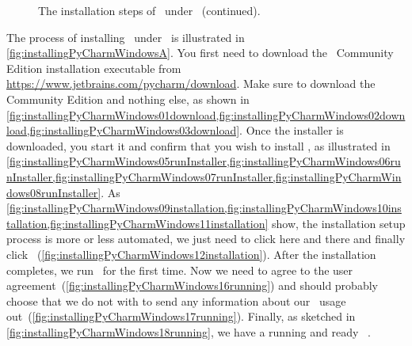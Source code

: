 \begin{figure}%
\ContinuedFloat%
\centering%
%
\floatSep%
%
%
\floatSep%
%
%
\floatSep%
%
\floatRowSep%
%
\floatSep%
%
%
\floatSep%
%
%
\floatSep%
%
\caption[]{The installation steps of \pycharm\ under \windows~(continued).}%
\label{fig:installingPyCharmWindowsC}%
\end{figure}%
%
The process of installing \pycharm\ under \windows\ is illustrated in \cref{fig:installingPyCharmWindowsA}.
You first need to download the \pycharm\ Community Edition installation executable from \url{https://www.jetbrains.com/pycharm/download}.
Make sure to download the Community Edition and nothing else, as shown in \cref{fig:installingPyCharmWindows01download,fig:installingPyCharmWindows02download,fig:installingPyCharmWindows03download}.
Once the installer is downloaded, you start it and confirm that you wish to install \pycharm, as illustrated in \cref{fig:installingPyCharmWindows05runInstaller,fig:installingPyCharmWindows06runInstaller,fig:installingPyCharmWindows07runInstaller,fig:installingPyCharmWindows08runInstaller}.
As \cref{fig:installingPyCharmWindows09installation,fig:installingPyCharmWindows10installation,fig:installingPyCharmWindows11installation} show, the installation setup process is more or less automated, we just need to click  here and there and finally click ~(\cref{fig:installingPyCharmWindows12installation}).
After the installation completes, we run \pycharm\ for the first time.
Now we need to agree to the user agreement~(\cref{fig:installingPyCharmWindows16running}) and should probably choose that we do not with to send any information about our \pycharm\ usage out~(\cref{fig:installingPyCharmWindows17running}).
Finally, as sketched in \cref{fig:installingPyCharmWindows18running}, we have a running and ready \pycharm\ .%
%
\FloatBarrier%
\endhsection%
%

